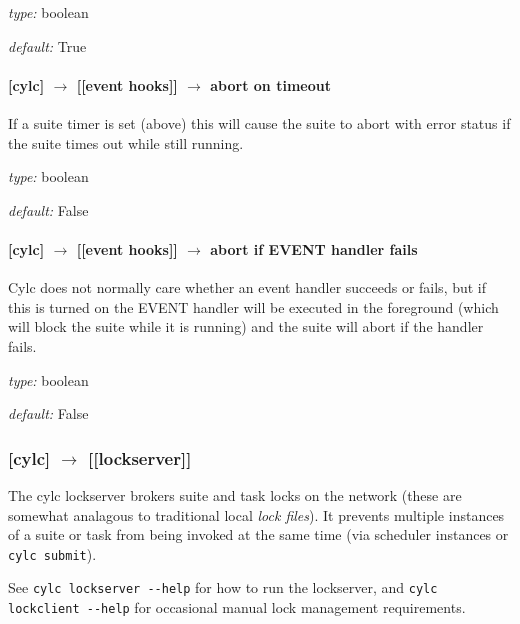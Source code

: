 \begin{myitemize}
    \item {\em type:} boolean
    \item {\em default:} True
\end{myitemize}

\paragraph[abort on timeout]{[cylc] $\rightarrow$ [[event hooks]] $\rightarrow$ abort on timeout}

If a suite timer is set (above) this will cause the suite to abort with
error status if the suite times out while still running.

\begin{myitemize}
    \item {\em type:} boolean
    \item {\em default:} False
\end{myitemize}

\paragraph[abort if startup handler fails]{[cylc] $\rightarrow$ [[event hooks]] $\rightarrow$ abort if EVENT handler fails}

Cylc does not normally care whether an event handler succeeds or fails,
but if this is turned on the EVENT handler will be executed in the
foreground (which will block the suite while it is running) and the
suite will abort if the handler fails.

\begin{myitemize}
    \item {\em type:} boolean
    \item {\em default:} False
\end{myitemize}

\subsubsection[{[[}lockserver{]]}]{[cylc] $\rightarrow$ [[lockserver]]}

The cylc lockserver brokers suite and task locks on the network (these
are somewhat analagous to traditional local {\em lock files}). It
prevents multiple instances of a suite or task from being invoked 
at the same time (via scheduler instances or \lstinline=cylc submit=).
 
See \lstinline=cylc lockserver --help= for 
how to run the lockserver, and \lstinline=cylc lockclient --help= for 
occasional manual lock management requirements. 

